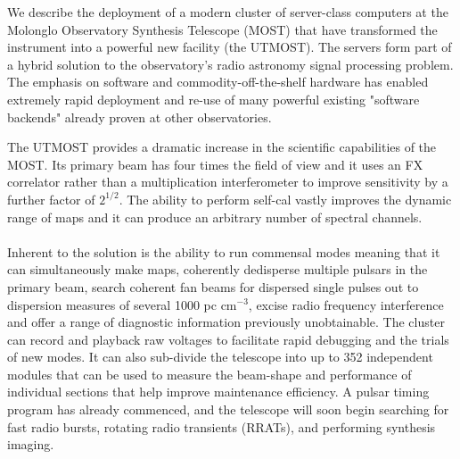 We describe the deployment of a modern cluster of server-class computers at the Molonglo Observatory Synthesis Telescope (MOST) that have transformed the instrument into a powerful new facility (the UTMOST). The servers form part of a hybrid solution to the observatory's radio astronomy signal processing problem. The emphasis on software and commodity-off-the-shelf hardware has enabled extremely rapid deployment and re-use of many powerful existing "software backends" already proven at other observatories. 

The UTMOST provides a dramatic increase in the scientific capabilities of the MOST. Its primary beam has four times the field of view and it uses an FX correlator rather than a multiplication interferometer to improve sensitivity by a further factor of $2^{1/2}$. The ability to perform self-cal vastly improves the dynamic range of maps and it can produce an arbitrary number of spectral channels.\\\\ Inherent to the solution is the ability to run commensal modes meaning that it can simultaneously make maps, coherently dedisperse multiple pulsars in the primary beam, search coherent fan beams for dispersed single pulses out to dispersion measures of several 1000 pc cm$^{-3}$, excise radio frequency interference and offer a range of diagnostic information previously unobtainable. The cluster can record and playback raw voltages to facilitate rapid debugging and the trials of new modes. It can also sub-divide the telescope into up to 352 independent modules that can be used to measure the beam-shape and performance of individual sections that help improve maintenance efficiency. A pulsar timing program has already commenced, and the telescope will soon begin searching for fast radio bursts, rotating radio transients (RRATs), and performing synthesis imaging. 
